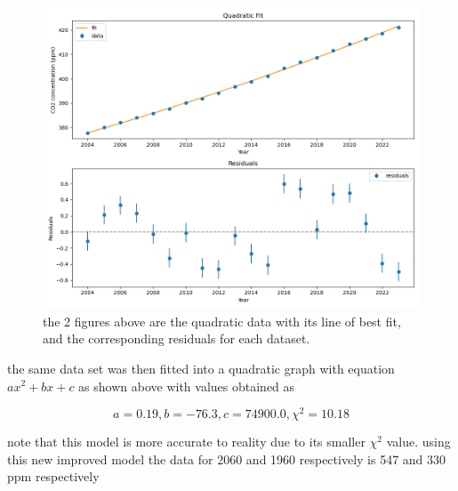 \documentclass{article}
\begin{document}
\begin{figure}[h]
  \centering
  \includegraphics[width=\textwidth]{Exercise 1-2.png} 
  \caption{the 2 figures above are the quadratic data with its line of best fit,
  and the corresponding residuals for each dataset.}
  \label{fig:fit_and_residuals}
\end{figure}

the same data set was then fitted into a quadratic graph with 
equation \(ax^2 + bx + c\) as shown above with values obtained as

\[a = 0.19, b = -76.3, c = 74900.0, \chi^2 = 10.18\]

note that this model is more accurate to reality due to its smaller
$\chi^2$ value. using this new improved model the
data for 2060 and 1960 respectively
is 547 and 330 ppm respectively
\end{document}
